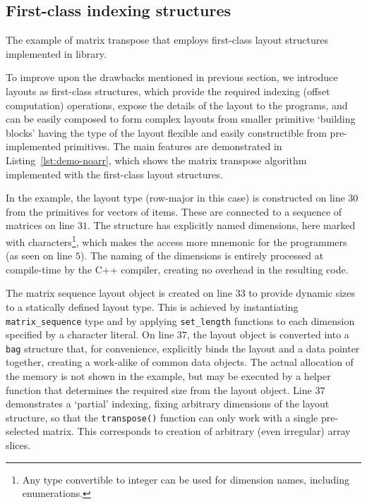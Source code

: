 \subsection{First-class indexing structures}
\label{subsec:fstclass}

\begin{listing}[h]
    \vspace{-10pt}
    \vspace{-20pt}
    \caption{The example of matrix transpose that employs first-class layout structures implemented in \Noarr{} library.}
    \label{lst:demo-noarr}
\end{listing}

To improve upon the drawbacks mentioned in previous section, we introduce layouts as first-class structures, which provide the required indexing (offset computation) operations, expose the details of the layout to the programs, and can be easily composed to form complex layouts from smaller primitive `building blocks' having the type of the layout flexible and easily constructible from pre-implemented primitives. The main features are demonstrated in Listing~\ref{lst:demo-noarr}, which shows the matrix transpose algorithm implemented with the first-class layout structures.

In the example, the layout type (row-major in this case) is constructed on line $30$ from the \Noarr{} primitives for vectors of items. These are connected to a sequence of matrices on line $31$. The structure has explicitly named dimensions, here marked with characters\footnote{Any type convertible to integer can be used for dimension names, including enumerations.}, which makes the access more mnemonic for the programmers (as seen on line $5$). The naming of the dimensions is entirely processed at compile-time by the C++ compiler, creating no overhead in the resulting code.

The matrix sequence layout object is created on line $33$ to provide dynamic sizes to a statically defined layout type. This is achieved by instantiating \texttt{matrix\_sequence} type and by applying \texttt{set\_length} functions to each dimension specified by a character literal. On line $37$, the layout object is converted into a \texttt{bag} structure that, for convenience, explicitly binds the layout and a data pointer together, creating a work-alike of common data objects. The actual allocation of the memory is not shown in the example, but may be executed by a helper function that determines the required size from the layout object. Line $37$ demonstrates a `partial' indexing, fixing arbitrary dimensions of the layout structure, so that the \texttt{transpose()} function can only work with a single pre-selected matrix. This corresponds to creation of arbitrary (even irregular) array slices.

